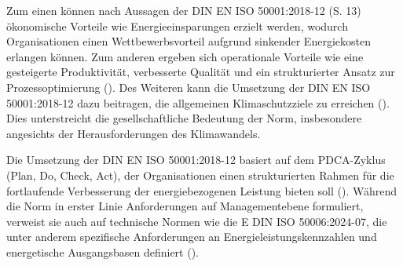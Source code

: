Zum einen können nach Aussagen der DIN EN ISO 50001:2018-12 (S. 13) ökonomische Vorteile wie Energieeinsparungen erzielt werden, wodurch Organisationen einen Wettbewerbsvorteil
aufgrund sinkender Energiekosten erlangen können. Zum anderen ergeben sich operationale Vorteile wie eine gesteigerte Produktivität, verbesserte Qualität
und ein strukturierter Ansatz zur Prozessoptimierung (\cite{Marimon.2017}). Des Weiteren kann die Umsetzung der DIN EN ISO 50001:2018-12 dazu beitragen, die allgemeinen
Klimaschutzziele zu erreichen (\cite{ISO.2018}). Dies unterstreicht die gesellschaftliche Bedeutung der Norm, insbesondere angesichts der Herausforderungen
des Klimawandels.

Die Umsetzung der DIN EN ISO 50001:2018-12 basiert auf dem PDCA-Zyklus (Plan, Do, Check, Act), der Organisationen einen strukturierten Rahmen für die fortlaufende
Verbesserung der energiebezogenen Leistung bieten soll (\cite[S. 7]{ISO.2018}).
Während die Norm in erster Linie Anforderungen auf Managementebene formuliert, verweist sie auch auf technische Normen wie die E DIN ISO 50006:2024-07, die unter anderem
spezifische Anforderungen an Energieleistungskennzahlen und energetische Ausgangsbasen definiert (\cite{ISO.2024, ISO.2018}).